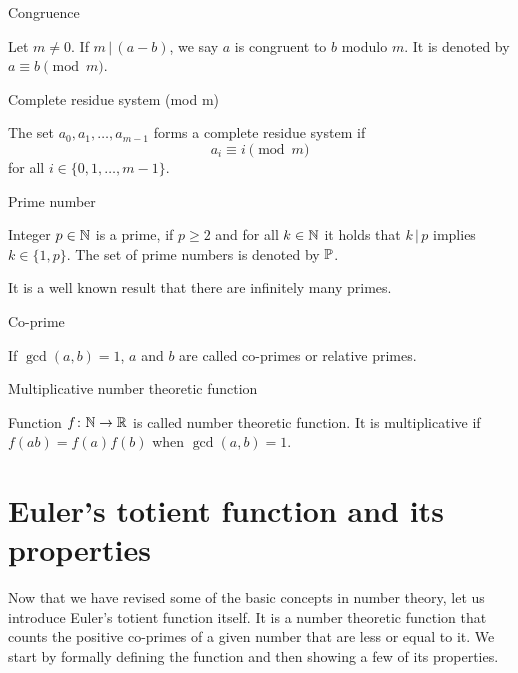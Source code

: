 \documentclass{article}
\begin{document}
\begin{definition}
Congruence

Let $m\not=0$. If $m\,\vert\,(a-b)$, we say $a$ is congruent to $b$ modulo $m$. It is denoted by $a\equiv b \pmod{m}$.
\end{definition}

\begin{definition}
Complete residue system (mod m)

The set $a_0,a_1,\dots,a_{m-1}$ forms a complete residue system if
\begin{equation*}
    a_i \equiv i \pmod{m}
\end{equation*}
for all $i\in\{0,1,\dots,m-1\}$.
\end{definition}

\begin{definition}
Prime number

Integer $p\in\mathbb{N}$ is a prime, if $p \geq 2$ and for all $k\in\mathbb{N}$ it holds that $k \,\vert\, p$ implies $k\in\{1, p\}$. The set of prime numbers is denoted by $\mathbb{P}$.

It is a well known result that there are infinitely many primes.


\end{definition}

\begin{definition}
Co-prime

If $\gcd(a,b) = 1$, $a$ and $b$ are called co-primes or relative primes.
\end{definition}

\begin{definition}
Multiplicative number theoretic function

Function $f\colon \mathbb{N} \rightarrow \mathbb{R}$ is called number theoretic function. It is multiplicative if $f(ab) = f(a)f(b)$ when $\gcd(a, b)=1$.

\end{definition}

\section{Euler's totient function and its properties}

Now that we have revised some of the basic concepts in number theory, let us introduce Euler's totient function itself. It is a number theoretic function that counts the positive co-primes of a given number that are less or equal to it. We start by formally defining the function and then showing a few of its properties.
\end{document}
